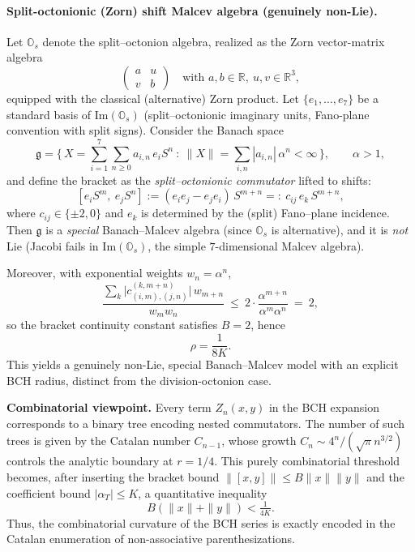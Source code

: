 \documentclass[11pt]{amsart}
\numberwithin{equation}{section}
\theoremstyle{remark}
\begin{document}
\paragraph{Split-octonionic (Zorn) shift Malcev algebra (genuinely non-Lie).}
Let $\mathbb{O}_s$ denote the split--octonion algebra, realized as the Zorn vector-matrix algebra
\[
\begin{pmatrix} a & u \\ v & b \end{pmatrix}
\quad\text{with } a,b\in\mathbb{R},\ u,v\in\mathbb{R}^3,
\]
equipped with the classical (alternative) Zorn product.
Let $\{e_1,\dots,e_7\}$ be a standard basis of $\mathrm{Im}(\mathbb{O}_s)$ (split--octonionic imaginary units, Fano-plane convention with split signs).
Consider the Banach space
\[
\mathfrak g
= \Big\{\, X=\sum_{i=1}^7 \sum_{n\ge0} a_{i,n}\, e_i S^n \ :\
\|X\|=\sum_{i,n} |a_{i,n}|\, \alpha^n <\infty \,\Big\},
\qquad \alpha>1,
\]
and define the bracket as the \emph{split--octonionic commutator} lifted to shifts:
\[
[e_i S^m,\ e_j S^n]
:= (e_i e_j - e_j e_i)\, S^{m+n}
=:\ c_{ij}\, e_k\, S^{m+n},
\]
where $c_{ij}\in\{\pm 2,0\}$ and $e_k$ is determined by the (split) Fano--plane incidence.
Then $\mathfrak g$ is a \emph{special} Banach--Malcev algebra (since $\mathbb{O}_s$ is alternative), and it is \emph{not} Lie (Jacobi fails in $\mathrm{Im}(\mathbb{O}_s)$, the simple $7$-dimensional Malcev algebra).

Moreover, with exponential weights $w_n=\alpha^n$,
\[
\frac{\sum_{k} \big|c^{(k,m+n)}_{(i,m),(j,n)}\big|\, w_{m+n}}{w_m w_n}
\ \le\ 2 \cdot \frac{\alpha^{m+n}}{\alpha^m \alpha^n} \ =\ 2,
\]
so the bracket continuity constant satisfies $B = 2$, hence
\[
\rho = \frac{1}{8K}.
\]
This yields a genuinely non-Lie, special Banach--Malcev model with an explicit BCH radius, distinct from the division-octonion case.

\medskip
\noindent\textbf{Combinatorial viewpoint.}
Every term $Z_n(x,y)$ in the BCH expansion corresponds to a binary tree encoding nested commutators.
The number of such trees is given by the Catalan number $C_{n-1}$, whose growth $C_n\sim4^n/(\sqrt{\pi}n^{3/2})$ controls the analytic boundary at $r=1/4$.
This purely combinatorial threshold becomes, after inserting the bracket bound $\|[x,y]\|\le B\|x\|\|y\|$ and the coefficient bound $|\alpha_T| \leq K$, a quantitative inequality
\[
B(\|x\|+\|y\|) < \tfrac{1}{4K}.
\]
Thus, the combinatorial curvature of the BCH series is exactly encoded in the Catalan enumeration of non-associative parenthesizations.
\end{document}
